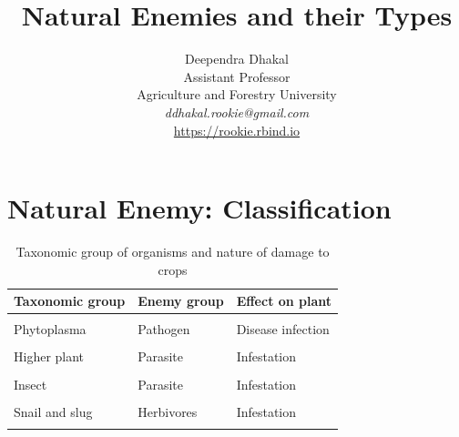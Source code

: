 \documentclass[10pt,dvipsnames,ignorenonframetext,aspectratio=169]{beamer}
\title[]{Natural Enemies and their Types}
\author[
        \vspace{-1cm}Deependra Dhakal\\
Assistant Professor\\
Agriculture and Forestry University\\
\textit{ddhakal.rookie@gmail.com}\\
\url{https://rookie.rbind.io}
    ]{\vspace{-1cm}Deependra Dhakal\\
Assistant Professor\\
Agriculture and Forestry University\\
\textit{ddhakal.rookie@gmail.com}\\
\url{https://rookie.rbind.io}}
\date[
      
  ]{
    }
\begin{document}
  \begin{frame}[plain]
  \titlepage
  \end{frame}



\hypertarget{natural-enemy-classification}{%
\section{Natural Enemy:
Classification}\label{natural-enemy-classification}}

\begin{frame}{}
\protect\hypertarget{section}{}
\begingroup\fontsize{8}{10}\selectfont

\begin{longtable}[t]{lll}
\caption{\label{tab:natural-enemy-classification}Taxonomic group of organisms and nature of damage to crops}\\
\toprule
Taxonomic group & Enemy group & Effect on plant\\
\midrule
\cellcolor{gray!6}{Virus} & \cellcolor{gray!6}{Pathogen} & \cellcolor{gray!6}{Disease infection}\\
Phytoplasma & Pathogen & Disease infection\\
\cellcolor{gray!6}{Fungus} & \cellcolor{gray!6}{Pathogen} & \cellcolor{gray!6}{Disease infection}\\
Higher plant & Parasite & Infestation\\
\cellcolor{gray!6}{Nematode} & \cellcolor{gray!6}{Parasite} & \cellcolor{gray!6}{Infestation}\\
\addlinespace
Insect & Parasite & Infestation\\
\cellcolor{gray!6}{Insect} & \cellcolor{gray!6}{Herbivores} & \cellcolor{gray!6}{Infestation}\\
Snail and slug & Herbivores & Infestation\\
\cellcolor{gray!6}{Vertebrate} & \cellcolor{gray!6}{Herbivores} & \cellcolor{gray!6}{Biting damage}\\
\bottomrule
\end{longtable}
\endgroup{}
\end{frame}
\end{document}
